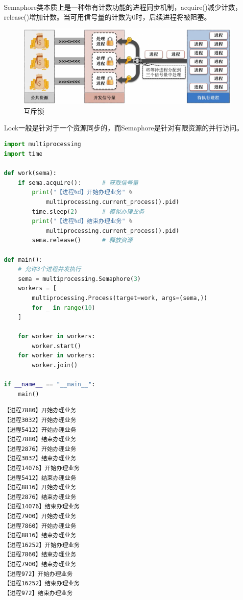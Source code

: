Semaphore类本质上是一种带有计数功能的进程同步机制，acquire()减少计数，release()增加计数。当可用信号量的计数为0时，后续进程将被阻塞。

\begin{figure}[H]
    \centering
    \includegraphics[scale=0.6]{img/C2/2-7/1.png}
    \caption{互斥锁}
\end{figure}

Lock一般是针对于一个资源同步的，而Semaphore是针对有限资源的并行访问。\\


\begin{lstlisting}[language=Python]
import multiprocessing
import time

def work(sema):
	if sema.acquire():      # 获取信号量
		print("【进程%d】开始办理业务" % 
			multiprocessing.current_process().pid)
		time.sleep(2)       # 模拟办理业务
		print("【进程%d】结束办理业务" % 
			multiprocessing.current_process().pid)
		sema.release()      # 释放资源

def main():
	# 允许3个进程并发执行
	sema = multiprocessing.Semaphore(3)
	workers = [
		multiprocessing.Process(target=work, args=(sema,))
		for _ in range(10)
	]

	for worker in workers:
		worker.start()
	for worker in workers:
		worker.join()

if __name__ == "__main__":
	main()
\end{lstlisting}

\begin{tcolorbox}
    \begin{verbatim}
【进程7880】开始办理业务
【进程3032】开始办理业务
【进程5412】开始办理业务
【进程7880】结束办理业务
【进程2876】开始办理业务
【进程3032】结束办理业务
【进程14076】开始办理业务
【进程5412】结束办理业务
【进程8816】开始办理业务
【进程2876】结束办理业务
【进程14076】结束办理业务
【进程7900】开始办理业务 
【进程7860】开始办理业务 
【进程8816】结束办理业务 
【进程16252】开始办理业务
【进程7860】结束办理业务
【进程7900】结束办理业务
【进程972】开始办理业务
【进程16252】结束办理业务
【进程972】结束办理业务
	\end{verbatim}
\end{tcolorbox}

